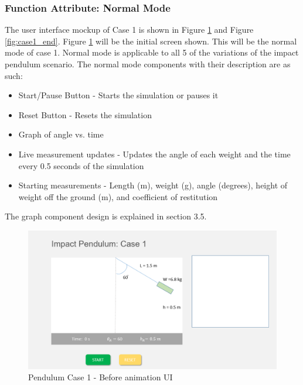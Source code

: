 \documentclass[onecolumn, draftclsnofoot,10pt, compsoc]{IEEEtran}
\begin{document}
\subsubsection{Function Attribute: Normal Mode}
The user interface mockup of Case 1 is shown in Figure \ref{fig:case1_start} and Figure \ref{fig:case1_end}. Figure \ref{fig:case1_start} will be the initial screen shown. This will be the normal mode of case 1. Normal mode is applicable to all 5 of the variations of the impact pendulum scenario. 
The normal mode components with their description are as such:
\begin{itemize}
    \item Start/Pause Button - Starts the simulation or pauses it 
    \item Reset Button - Resets the simulation
    \item Graph of angle vs. time 
    \item Live measurement updates - Updates the angle of each weight and the time every 0.5 seconds of the simulation
    \item Starting measurements  - Length (m), weight (g), angle (degrees), height of weight off the ground (m), and coefficient of restitution 
\end{itemize}

The graph component design is explained in section 3.5. \newline


\begin{figure}[H]
  \includegraphics[width=5.5 in]{pendulum_case_1_1.png}
  \caption{Pendulum Case 1 - Before animation UI}
  \label{fig:case1_start}
\end{figure}
 
\end{document}
